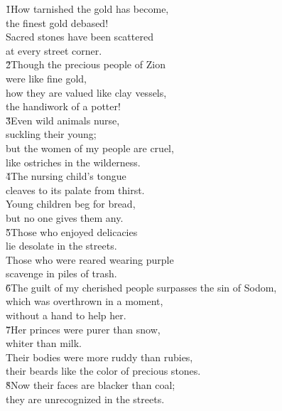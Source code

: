 \begin{poetry}
\poeml {}
\v{1}How tarnished the gold has become, \\
\poemll    the finest gold debased! \\
\poeml Sacred stones have been scattered \\
\poemll    at every street corner. \\
\poeml \v{2}Though the precious people of Zion \\
\poemll    were like fine gold, \\
\poeml how they are valued like clay vessels, \\
\poemll    the handiwork of a potter! \\
\poeml \v{3}Even wild animals nurse, \\
\poemll    suckling their young; \\
\poeml but the women of my people are cruel, \\
\poemll    like ostriches in the wilderness. \\
\poeml \v{4}The nursing child's tongue \\
\poemll    cleaves to its palate from thirst. \\
\poeml Young children beg for bread, \\
\poemll    but no one gives them any. \\
\poeml \v{5}Those who enjoyed delicacies \\
\poemll    lie desolate in the streets. \\
\poeml Those who were reared wearing purple \\
\poemll    scavenge in piles of trash. \\
\poeml \v{6}The guilt of my cherished people surpasses the sin of Sodom, \\
\poemll    which was overthrown in a moment, \\
\poemlll       without a hand to help her. \\
\poeml \v{7}Her princes were purer than snow, \\
\poemll    whiter than milk. \\
\poeml Their bodies were more ruddy than rubies, \\
\poemll    their beards like the color of precious stones. \\
\poeml \v{8}Now their faces are blacker than coal; \\
\poemll    they are unrecognized in the streets. \\

\end{poetry}
